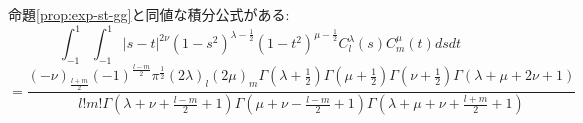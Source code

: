 \documentclass[pdf,notes]{beamer}
\newenvironment{taggedprop}[1]
 {\renewcommand\thetaggedpropx{#1}\taggedpropx}
  {\endtaggedpropx}
\begin{document}
\begin{frame}
	命題\ref{prop:exp-st-gg}と同値な積分公式がある:
	\begin{taggedprop}{$\;1'$}
		\label{prop:int-st-gg}
		\begin{equation*}
			\int_{- 1}^1 \int_{- 1}^1 | s - t |^{2 \nu} (1 - s^2)^{\lambda - \frac{1}{2}}
			(1 - t^2)^{\mu - \frac{1}{2}} C_l^{\lambda} (s) C_m^{\mu} (t) d s d t
		\end{equation*}
		{\scriptsize
		\begin{equation}
			=\frac{(- \nu)_{\frac{l + m}{2}} (- 1)^{\frac{l - m}{2}} \pi^{\frac{1}{2}} (2
			\lambda)_l (2 \mu)_m \Gamma \left( \lambda + \frac{1}{2} \right) \Gamma \left(
			\mu + \frac{1}{2} \right) \Gamma \left( \nu + \frac{1}{2} \right) \Gamma
		(\lambda + \mu + 2 \nu + 1)}{l!m! \Gamma \left( \lambda + \nu + \frac{l -
		m}{2} + 1 \right) \Gamma \left( \mu + \nu - \frac{l - m}{2} + 1 \right) \Gamma
		\left( \lambda + \mu + \nu + \frac{l + m}{2} + 1 \right)}
			\label{eqn:int-st-gg}
			\tag{1$'$}
		\end{equation}
		}
	\end{taggedprop}
\end{frame}
\end{document}
